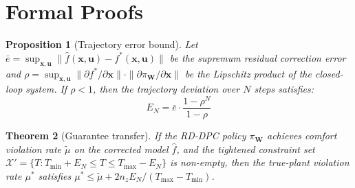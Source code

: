 \documentclass[12pt]{article}
\theoremstyle{plain}
\newtheorem{theorem}{Theorem}
\newtheorem{proposition}[theorem]{Proposition}
\theoremstyle{definition}
\begin{document}
\section{Formal Proofs}\label{app:proofs}

\begin{proposition}[Trajectory error bound]\label{prop:traj_bound}
Let $\bar{e} = \sup_{\mathbf{x},\mathbf{u}} \|\hat{f}(\mathbf{x},\mathbf{u}) - f^*(\mathbf{x},\mathbf{u})\|$ be the supremum residual correction error and $\rho = \sup_{\mathbf{x},\mathbf{u}} \|\partial f^*/\partial \mathbf{x}\| \cdot \|\partial \pi_{\mathbf{W}} / \partial \mathbf{x}\|$ be the Lipschitz product of the closed-loop system. If $\rho < 1$, then the trajectory deviation over $N$ steps satisfies:
\begin{equation}
E_N = \bar{e} \cdot \frac{1 - \rho^N}{1 - \rho}
\end{equation}
\end{proposition}

\begin{theorem}[Guarantee transfer]\label{thm:guarantee}
If the RD-DPC policy $\pi_{\mathbf{W}}$ achieves comfort violation rate $\tilde{\mu}$ on the corrected model $\hat{f}$, and the tightened constraint set $\mathcal{X}' = \{T : T_{\min} + E_N \leq T \leq T_{\max} - E_N\}$ is non-empty, then the true-plant violation rate $\mu^*$ satisfies $\mu^* \leq \tilde{\mu} + 2n_z E_N / (T_{\max} - T_{\min})$.
\end{theorem}
\end{document}
